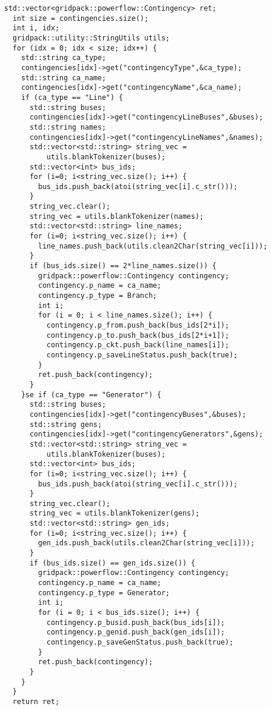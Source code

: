 {
\color{red}
\begin{Verbatim}[fontseries=b]
  std::vector<gridpack::powerflow::Contingency> ret;
  int size = contingencies.size();
  int i, idx;
  gridpack::utility::StringUtils utils;
  for (idx = 0; idx < size; idx++) {
    std::string ca_type;
    contingencies[idx]->get("contingencyType",&ca_type);
    std::string ca_name;
    contingencies[idx]->get("contingencyName",&ca_name);
    if (ca_type == "Line") {
      std::string buses;
      contingencies[idx]->get("contingencyLineBuses",&buses);
      std::string names;
      contingencies[idx]->get("contingencyLineNames",&names);
      std::vector<std::string> string_vec = 
          utils.blankTokenizer(buses);
      std::vector<int> bus_ids;
      for (i=0; i<string_vec.size(); i++) {
        bus_ids.push_back(atoi(string_vec[i].c_str()));
      }
      string_vec.clear();
      string_vec = utils.blankTokenizer(names);
      std::vector<std::string> line_names;
      for (i=0; i<string_vec.size(); i++) {
        line_names.push_back(utils.clean2Char(string_vec[i]));
      }
      if (bus_ids.size() == 2*line_names.size()) {
        gridpack::powerflow::Contingency contingency;
        contingency.p_name = ca_name;
        contingency.p_type = Branch;
        int i;
        for (i = 0; i < line_names.size(); i++) {
          contingency.p_from.push_back(bus_ids[2*i]);
          contingency.p_to.push_back(bus_ids[2*i+1]);
          contingency.p_ckt.push_back(line_names[i]);
          contingency.p_saveLineStatus.push_back(true);
        }
        ret.push_back(contingency);
      }
    }se if (ca_type == "Generator") {
      std::string buses;
      contingencies[idx]->get("contingencyBuses",&buses);
      std::string gens;
      contingencies[idx]->get("contingencyGenerators",&gens);
      std::vector<std::string> string_vec =
          utils.blankTokenizer(buses);
      std::vector<int> bus_ids;
      for (i=0; i<string_vec.size(); i++) {
        bus_ids.push_back(atoi(string_vec[i].c_str()));
      }
      string_vec.clear();
      string_vec = utils.blankTokenizer(gens);
      std::vector<std::string> gen_ids;
      for (i=0; i<string_vec.size(); i++) {
        gen_ids.push_back(utils.clean2Char(string_vec[i]));
      }
      if (bus_ids.size() == gen_ids.size()) {
        gridpack::powerflow::Contingency contingency;
        contingency.p_name = ca_name;
        contingency.p_type = Generator;
        int i;
        for (i = 0; i < bus_ids.size(); i++) {
          contingency.p_busid.push_back(bus_ids[i]);
          contingency.p_genid.push_back(gen_ids[i]);
          contingency.p_saveGenStatus.push_back(true);
        }
        ret.push_back(contingency);
      }
    }
  }
  return ret;
\end{Verbatim}
}

